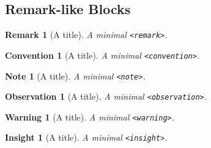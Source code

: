 \documentclass{sn-jnl}
\theoremstyle{thmstyleone}%
\theoremstyle{thmstyletwo}%
\theoremstyle{thmstylethree}%
\newtheorem{remark}[theorem]{Remark}
\newtheorem{warning}[theorem]{Warning}
\newtheorem{convention}[theorem]{Convention}
\newtheorem{insight}[theorem]{Insight}
\newtheorem{note}[theorem]{Note}
\newtheorem{observation}[theorem]{Observation}
\newcommand{\mono}[1]{\texttt{#1}}
\numberwithin{equation}{section}
\begin{document}
\subsection{Remark-like Blocks}\label{block-samples-remark-like}%
\begin{remark}[A title]\label{block-samples-remark-like-2}%
%
A minimal \mono{<remark>}.%
\end{remark}
\begin{convention}[A title]\label{block-samples-remark-like-3}%
%
A minimal \mono{<convention>}.%
\end{convention}
\begin{note}[A title]\label{block-samples-remark-like-4}%
%
A minimal \mono{<note>}.%
\end{note}
\begin{observation}[A title]\label{block-samples-remark-like-5}%
%
A minimal \mono{<observation>}.%
\end{observation}
\begin{warning}[A title]\label{block-samples-remark-like-6}%
%
A minimal \mono{<warning>}.%
\end{warning}
\begin{insight}[A title]\label{block-samples-remark-like-7}%
%
A minimal \mono{<insight>}.%
\end{insight}
%
%
\typeout{************************************************}
\typeout{************************************************}
%
\end{document}
